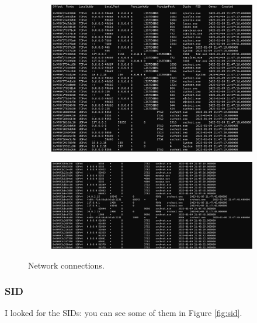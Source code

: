 \documentclass[12pt]{article}
\begin{document}
\begin{figure}[!ht]
        \centering
        \begin{subfigure}[b]{\textwidth}
            \centering
                \includegraphics[width=\textwidth]{images/bobnet1.png}
        \end{subfigure}
        \begin{subfigure}[b]{\textwidth}
            \centering
                \includegraphics[width=\textwidth]{images/bobnet2.png}
        \end{subfigure}
        \caption{Network connections.}
        \label{fig:bobnet}
\end{figure}

\subsubsection{SID}

I looked for the SIDs: you can see some of them in Figure \ref{fig:sid}.
\end{document}
